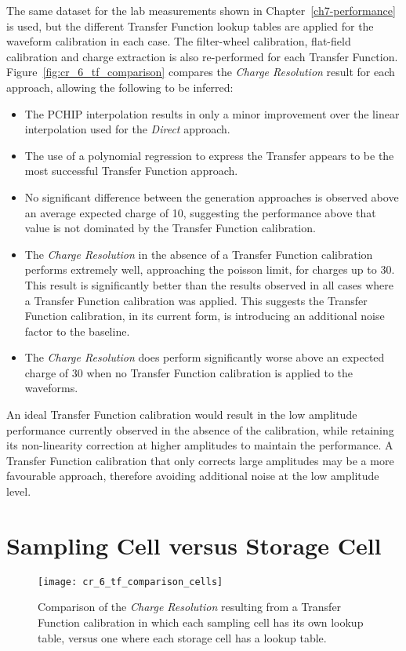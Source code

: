 The same dataset for the lab measurements shown in Chapter~\ref{ch7-performance} is used, but the different Transfer Function lookup tables are applied for the waveform calibration in each case. The filter-wheel calibration, flat-field calibration and charge extraction is also re-performed for each Transfer Function. Figure~\ref{fig:cr_6_tf_comparison} compares the \textit{Charge Resolution} result for each approach, allowing the following to be inferred:
\begin{itemize}
	\item The PCHIP interpolation results in only a minor improvement over the linear interpolation used for the \textit{Direct} approach.
	\item The use of a polynomial regression to express the Transfer appears to be the most successful Transfer Function approach.
	\item No significant difference between the generation approaches is observed above an average expected charge of \SI{10}{\pe}, suggesting the performance above that value is not dominated by the Transfer Function calibration.
	\item The \textit{Charge Resolution} in the absence of a Transfer Function calibration performs extremely well, approaching the poisson limit, for charges up to \SI{30}{\pe}. This result is significantly better than the results observed in all cases where a Transfer Function calibration was applied. This suggests the Transfer Function calibration, in its current form, is introducing an additional noise factor to the baseline.
	\item The \textit{Charge Resolution} does perform significantly worse above an expected charge of \SI{30}{\pe} when no Transfer Function calibration is applied to the waveforms.
\end{itemize}
An ideal Transfer Function calibration would result in the low amplitude performance currently observed in the absence of the calibration, while retaining its non-linearity correction at higher amplitudes to maintain the performance. A Transfer Function calibration that only corrects large amplitudes may be a more favourable approach, therefore avoiding additional noise at the low amplitude level.

\section{Sampling Cell versus Storage Cell}

\begin{figure}
	\centering
	\texttt{[image: cr\_6\_tf\_comparison\_cells]} 
	\caption[Comparison of the \textit{Charge Resolution} from the ``per sampling cell'' versus ``per storage cell''.]{Comparison of the \textit{Charge Resolution} resulting from a Transfer Function calibration in which each sampling cell has its own lookup table, versus one where each storage cell has a lookup table.} 
	\label{fig:cr_6_tf_comparison_cells}
\end{figure}

